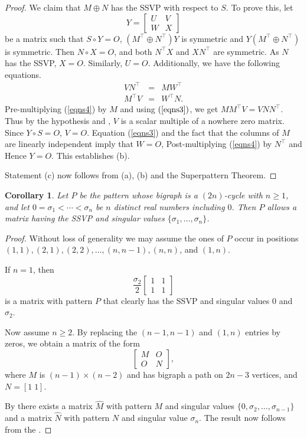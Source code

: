 \documentclass[preprint,12pt]{elsarticle}
\newcommand{\trans  }{^\top}
\newtheorem{corollary}[theorem]{Corollary}
\begin{document}
\begin{proof}
We claim that $M\oplus N$ has the SSVP with respect to $S$.
To prove this, let 
\[ 
Y= \left[ \begin{array}{c|c} 
U & V \\ \hline 
W& X 
\end{array} \right] 
\]
be a matrix such that $S \circ Y=O$, 
$(M\trans \oplus N\trans) Y$ is symmetric and $Y(M\trans \oplus N \trans)$
is symmetric.   Then $N \circ X=O$, and both $N\trans X$ and $X N\trans$ 
are symmetric. As $N$ has the SSVP, $X=O$.  Similarly, $U=O$.  Additionally, 
we have the following equations.
\begin{eqnarray}
\label{eqns3}
VN\trans & = & M W\trans \\
\label{eqns4}
M\trans V&=&W\trans N.
\end{eqnarray}
Pre-multiplying (\ref{eqns4}) by $M$ and using 
$(\ref{eqns3})$, we get $MM\trans V=VNN\trans$.
Thus by the hypothesis and ,
$V$ is a scalar multiple of a nowhere zero matrix.
Since $Y \circ S=O$, $V=O$. Equation (\ref{eqns3})
and the fact that the columns of $M$ are linearly independent imply that $W=O$, 
Post-multiplying (\ref{eqns4}) by $N\trans$ and   Hence $Y=O$. This establishes (b).

Statement (c) now follows from (a), (b) and the Superpattern Theorem. 
\end{proof}

\begin{corollary}
\label{cycle}
Let $P$ be the pattern whose bigraph is a $(2n)$-cycle with $n\geq 1$, 
and let $0=\sigma_1< \cdots < \sigma_n$ be $n$ distinct real numbers including $0$. 
Then $P$ allows a matrix having the SSVP and singular values $\{\sigma_1, \ldots, \sigma_n\}$.
\end{corollary} 

\begin{proof}
Without loss of generality we may assume the ones of $P$ occur
in positions $(1,1), (2,1), (2,2), \ldots, (n,n-1), (n,n)$, and $(1,n)$. 

If $n=1$, 
then 
\[ 
\frac{\sigma_2}{2}\left[ \begin{array}{rr}
1 & 1 \\
1 & 1 \end{array} \right] 
\] 
is a matrix with pattern $P$ that clearly has the SSVP
and singular values $0$ and $\sigma_2$. 

Now assume $n\geq 2$.
By replacing the $(n-1,n-1)$ and $(1,n)$ entries by zeros, we obtain 
a matrix of the form 
\[ 
\left[
\begin{array}{cc} 
M & O \\ 
O & N 
\end{array} 
\right],
\] 
where $M$ is $(n-1) \times (n-2)$  and has bigraph a path on $2n-3$ vertices, and 
$N= [ 1 \; 1] $.

By  there exists a matrix $\hat{M}$ with pattern $M$ and singular values 
$\{0, \sigma_2, \ldots, \sigma_{n-1} \}$ and a matrix $\widehat{N}$ 
with pattern $N$ and singular value $ \sigma_n$. 
The result now follows from the .
\end{proof}
\end{document}
